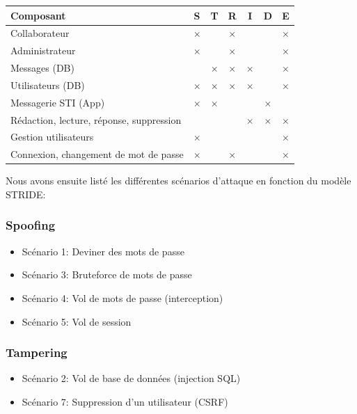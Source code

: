 \documentclass[a4paper,10pt]{article}
\begin{document}
\begin{center}
\begin{tabular}{|l c c c c c c|} 
 \hline
 Composant & S & T & R & I & D & E \\ [0.5ex] 
 \hline\hline
 Collaborateur & $\times$ & & $\times$ & & & $\times$\\
 \hline
 Administrateur & $\times$ & & $\times$ & & & $\times$ \\
 \hline
 Messages (DB) & & $\times$ & $\times$ & $\times$ &  & $\times$ \\
 \hline
 Utilisateurs (DB) & $\times$ & $\times$ & $\times$ & $\times$ &  & $\times$\\ 
 \hline
 Messagerie STI (App) & $\times$ & $\times$ &  &  & $\times$ & \\ 
 \hline
 Rédaction, lecture, réponse, suppression & & & & $\times$ & $\times$ & $\times$\\
 \hline
 Gestion utilisateurs & $\times$ & & & & & $\times$ \\ 
 \hline
 Connexion, changement de mot de passe & $\times$ & & $\times$ & & & $\times$\\  
 \hline
\end{tabular}
\end{center}
    
    Nous avons ensuite listé les différentes scénarios d'attaque en fonction du modèle STRIDE:
    \subsubsection*{Spoofing}
    \begin{onehalfspacing}
    \begin{itemize}
     \item Scénario 1: Deviner des mots de passe
     \item Scénario 3: Bruteforce de mots de passe
     \item Scénario 4: Vol de mots de passe (interception)
     \item Scénario 5: Vol de session
    \end{itemize}
    \end{onehalfspacing}
    \subsubsection*{Tampering}
    \begin{onehalfspacing}
    \begin{itemize}
     \item Scénario 2: Vol de base de données (injection SQL)
     \item Scénario 7: Suppression d'un utilisateur (CSRF)
    \end{itemize}
    \end{onehalfspacing}
\end{document}

